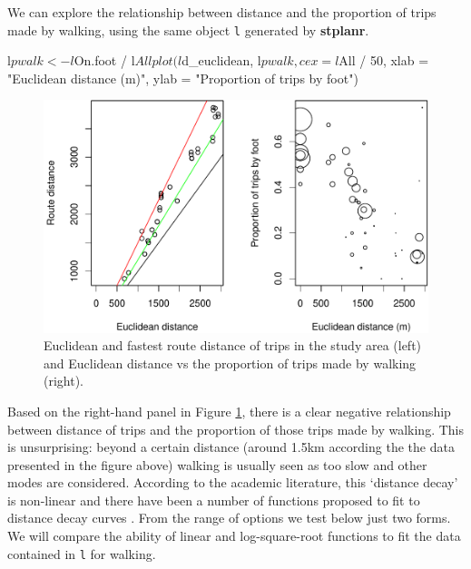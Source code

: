 We can explore the relationship between distance and the proportion of
trips made by walking, using the same object \texttt{l} generated by
\textbf{stplanr}.

\begin{Schunk}
\begin{Sinput}
l$pwalk <- l$On.foot / l$All
plot(l$d_euclidean, l$pwalk, cex = l$All / 50,
  xlab = "Euclidean distance (m)", ylab = "Proportion of trips by foot")
\end{Sinput}
\end{Schunk}

\begin{Schunk}
\begin{figure}
\includegraphics[width=1\linewidth]{euclidfastest-1} \caption[Euclidean and fastest route distance of trips in the study area (left) and Euclidean distance vs the proportion of trips made by walking (right)]{Euclidean and fastest route distance of trips in the study area (left) and Euclidean distance vs the proportion of trips made by walking (right).}\label{fig:euclidfastest}
\end{figure}
\end{Schunk}

Based on the right-hand panel in Figure \ref{fig:euclidfastest}, there
is a clear negative relationship between distance of trips and the
proportion of those trips made by walking. This is unsurprising: beyond
a certain distance (around 1.5km according the the data presented in the
figure above) walking is usually seen as too slow and other modes are
considered. According to the academic literature, this `distance decay'
is non-linear and there have been a number of functions proposed to fit
to distance decay curves \citep{martinez_new_2013}. From the range of
options we test below just two forms. We will compare the ability of
linear and log-square-root functions to fit the data contained in
\texttt{l} for walking.

